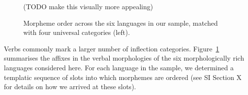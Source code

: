 \documentclass[11pt,letterpaper]{article}
\newcommand\mhahn[1]{{\color{red}(#1)}}
\begin{document}
\begin{figure}[]

\mhahn{TODO make this visually more appealing}

    \caption{Morpheme order across the six languages in our sample, matched with four universal categories (left).}
    \label{tab:table-orders}
\end{figure}


Verbs commonly mark a larger number of inflection categories.
Figure~\ref{tab:table-orders} summarises the affixes in the verbal morphologies of the six morphologically rich languages considered here.
For each language in the sample, we determined a templatic sequence of slots into which morphemes are ordered (see SI Section X for details on how we arrived at these slots).
\end{document}
